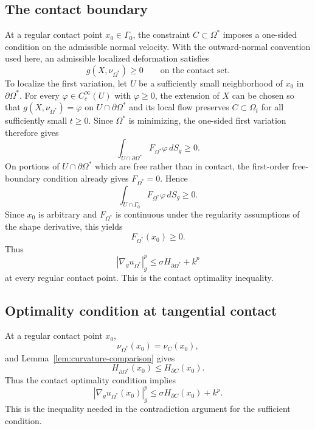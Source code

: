 \documentclass{article}
\begin{document}
\subsection{The contact boundary}


At a regular contact point $x_0\in\Gamma_0$, the constraint
$C\subset\Omega^\ast$ imposes a one-sided condition on the admissible
normal velocity. With the outward-normal convention used here, an
admissible localized deformation satisfies
\[
g(X,\nu_{\Omega^\ast})\geq0
\qquad\text{on the contact set.}
\]
To localize the first variation, let $U$ be a sufficiently small
neighborhood of $x_0$ in $\partial\Omega^\ast$. For every
$\varphi\in C_c^\infty(U)$ with $\varphi\geq0$, the extension of $X$
can be chosen so that
$g(X,\nu_{\Omega^\ast})=\varphi$ on $U\cap\partial\Omega^\ast$ and
its local flow preserves $C\subset\Omega_t$ for all sufficiently small
$t\geq0$. Since $\Omega^\ast$ is minimizing, the one-sided first variation
therefore gives
\[
\int_{U\cap\partial\Omega^\ast}
F_{\Omega^\ast}\varphi\,dS_g\geq0.
\]
On portions of $U\cap\partial\Omega^\ast$ which are free rather than in
contact, the first-order free-boundary condition already gives
$F_{\Omega^\ast}=0$. Hence
\[
\int_{U\cap\Gamma_0}F_{\Omega^\ast}\varphi\,dS_g\geq0.
\]
Since $x_0$ is arbitrary and $F_{\Omega^\ast}$ is continuous under the
regularity assumptions of the shape derivative, this yields
\[
F_{\Omega^\ast}(x_0)\geq0.
\]
Thus
\[
|\nabla_g u_{\Omega^\ast}|_g^p
\leq
\sigma H_{\partial\Omega^\ast}+k^p
\]
at every regular contact point. This is the contact optimality inequality.


\subsection{Optimality condition at tangential contact}

At a regular contact point $x_0$,
\[
\nu_{\Omega^\ast}(x_0)=\nu_C(x_0),
\]
and Lemma~\ref{lem:curvature-comparison} gives
\[
H_{\partial\Omega^\ast}(x_0)
\leq H_{\partial C}(x_0).
\]
Thus the contact optimality condition implies
\[
|\nabla_g u_{\Omega^\ast}(x_0)|_g^p
\leq
\sigma H_{\partial C}(x_0)+k^p.
\]
This is the inequality needed in the contradiction argument for the
sufficient condition.

\end{document}
